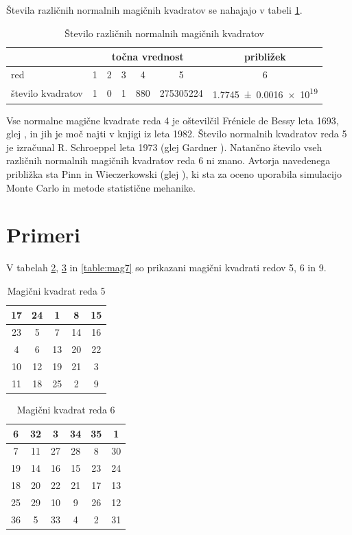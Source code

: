\documentclass[a4paper,12pt]{article}
\theoremstyle{definition}
\theoremstyle{plain}
\newenvironment{magic}[3]
{
    \begin{table}[!ht]
    \centering
    \caption{#2}
    \label{#3}
    \large
    \begin{tabular}{|*{#1}{c|}}
    \hline
}
{
    \end{tabular}
    \normalsize
    \end{table}
}
\begin{document}
Števila različnih normalnih magičnih kvadratov se nahajajo v tabeli \ref{table:stevila}.

\begin{table}[!ht]
   \centering
   \caption{Število različnih normalnih magičnih kvadratov}
   \label{table:stevila}
   \begin{tabular}{lcccccc}\toprule
      & \multicolumn{5}{c}{točna vrednost} & približek \\
      \midrule
      red & 1 & 2 & 3 & 4 & 5 & 6 \\
      število kvadratov & 1 & 0 & 1 & 880 & \num{275305224} & \num[separate-uncertainty]{1.7745 \pm 0.0016 e19} \\
      \bottomrule
   \end{tabular}
\end{table}

Vse normalne magične kvadrate reda 4 je oštevilčil Frénicle de Bessy
leta 1693, glej \cite{bessy}, in jih je moč najti v knjigi \cite{berlekamp}
iz leta 1982. Število normalnih kvadratov reda 5 je izračunal
R. Schroeppel leta 1973 (glej Gardner \cite{gardner}).
Natančno število vseh različnih normalnih magičnih kvadratov reda 6 ni znano.
Avtorja navedenega približka sta Pinn in Wieczerkowski (glej \cite{pinn}), ki
sta za oceno uporabila simulacijo Monte Carlo in metode statistične mehanike.


\section{Primeri}

V tabelah \ref{table:mag5}, \ref{table:mag6} in \ref{table:mag7} so prikazani
magični kvadrati redov 5, 6 in 9. %


\begin{magic}{5}{Magični kvadrat reda 5}{table:mag5}
17 & 24 & 1 & 8 & 15 \\ \hline
23 & 5 & 7 & 14 & 16 \\ \hline
4 & 6 & 13 & 20 & 22 \\ \hline
10 & 12 & 19 & 21 & 3 \\ \hline
11 & 18 & 25 & 2 & 9 \\ \hline
\end{magic}
  


\begin{magic}{6}{Magični kvadrat reda 6}{table:mag6}
6 & 32 & 3 & 34 & 35 & 1 \\ \hline
7 & 11 & 27 & 28 & 8 & 30 \\ \hline
19 & 14 & 16 & 15 & 23 & 24 \\ \hline
18 & 20 & 22 & 21 & 17 & 13 \\ \hline
25 & 29 & 10 & 9 & 26 & 12 \\ \hline
36 & 5 & 33 & 4 & 2 & 31 \\ \hline
\end{magic}
  
\end{document}
